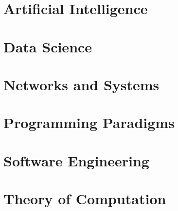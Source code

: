 \section{Artificial Intelligence}



\section{Data Science}



\section{Networks and Systems}



\section{Programming Paradigms}



\section{Software Engineering}



\section{Theory of Computation}

